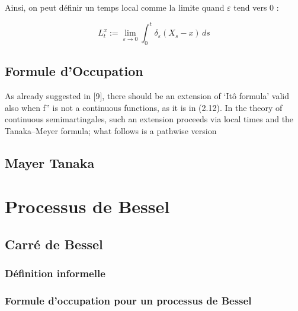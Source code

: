\documentclass[openany]{book}
\theoremstyle{thmfont}
\theoremstyle{deffont}
\theoremstyle{thmfont}
\theoremstyle{deffont}
\begin{document}
Ainsi, on peut définir un temps local comme la limite quand $\varepsilon$ tend vers $0$ :

\begin{equation}
  L_t^x := \lim_{\varepsilon \to 0} \int_0^t \delta_\varepsilon(X_s - x)\, ds
\end{equation}
\section{Formule d'Occupation}

{\color{red}As already suggested in [9], there should be an extension of ‘Itô formula’ valid also when f'' is not a continuous
functions, as it is in (2.12). In the theory of continuous semimartingales, such an extension proceeds via local times
and the Tanaka–Meyer formula; what follows is a pathwise version}
\section{Mayer Tanaka}

\chapter{Processus de Bessel}
\section{Carré de Bessel}
\subsection{Définition informelle}
\subsection{Formule d'occupation pour un processus de Bessel}
\end{document}
